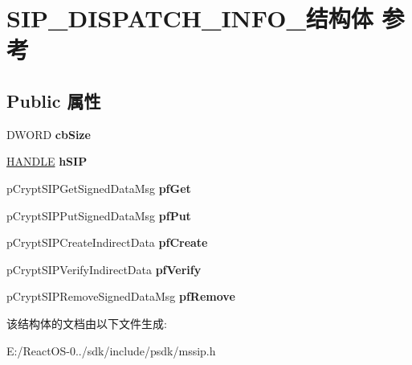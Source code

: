 \hypertarget{struct_s_i_p___d_i_s_p_a_t_c_h___i_n_f_o__}{}\section{S\+I\+P\+\_\+\+D\+I\+S\+P\+A\+T\+C\+H\+\_\+\+I\+N\+F\+O\+\_\+结构体 参考}
\label{struct_s_i_p___d_i_s_p_a_t_c_h___i_n_f_o__}
\subsection*{Public 属性}
\begin{DoxyCompactItemize}
\item 
\mbox{\label{struct_s_i_p___d_i_s_p_a_t_c_h___i_n_f_o___a621cc2b53952fd5e194e584e90eff66e}} 
D\+W\+O\+RD {\bfseries cb\+Size}
\item 
\mbox{\label{struct_s_i_p___d_i_s_p_a_t_c_h___i_n_f_o___aa151c1da5bcf958f091ce72657475792}} 
\hyperlink{interfacevoid}{H\+A\+N\+D\+LE} {\bfseries h\+S\+IP}
\item 
\mbox{\label{struct_s_i_p___d_i_s_p_a_t_c_h___i_n_f_o___a1405104b2414694272596f9f780b48a4}} 
p\+Crypt\+S\+I\+P\+Get\+Signed\+Data\+Msg {\bfseries pf\+Get}
\item 
\mbox{\label{struct_s_i_p___d_i_s_p_a_t_c_h___i_n_f_o___a4080799c3473ee3fea95d66970d67f4f}} 
p\+Crypt\+S\+I\+P\+Put\+Signed\+Data\+Msg {\bfseries pf\+Put}
\item 
\mbox{\label{struct_s_i_p___d_i_s_p_a_t_c_h___i_n_f_o___adab426d0d4c83f5aac599f8f638f9551}} 
p\+Crypt\+S\+I\+P\+Create\+Indirect\+Data {\bfseries pf\+Create}
\item 
\mbox{\label{struct_s_i_p___d_i_s_p_a_t_c_h___i_n_f_o___a0047c99e017ce70a7db19cd8b11517e0}} 
p\+Crypt\+S\+I\+P\+Verify\+Indirect\+Data {\bfseries pf\+Verify}
\item 
\mbox{\label{struct_s_i_p___d_i_s_p_a_t_c_h___i_n_f_o___a1196a723b9bdadc40ab6b44335398df3}} 
p\+Crypt\+S\+I\+P\+Remove\+Signed\+Data\+Msg {\bfseries pf\+Remove}
\end{DoxyCompactItemize}


该结构体的文档由以下文件生成\+:\begin{DoxyCompactItemize}
\item 
E\+:/\+React\+O\+S-\/0../sdk/include/psdk/mssip.\+h\end{DoxyCompactItemize}
